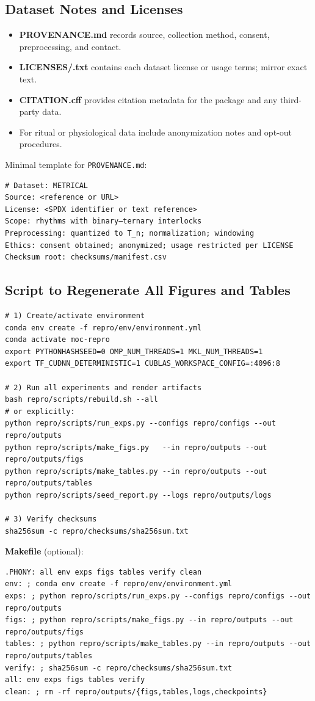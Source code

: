 \documentclass[12pt]{article}
\numberwithin{equation}{section}
\theoremstyle{plain}
\theoremstyle{definition}
\theoremstyle{remark}
\begin{document}
\subsection*{Dataset Notes and Licenses}
\begin{itemize}
  \item \textbf{PROVENANCE.md} records source, collection method, consent, preprocessing, and contact.
  \item \textbf{LICENSES/\*.txt} contains each dataset license or usage terms; mirror exact text.
  \item \textbf{CITATION.cff} provides citation metadata for the package and any third-party data.
  \item For ritual or physiological data include anonymization notes and opt-out procedures.
\end{itemize}
Minimal template for \texttt{PROVENANCE.md}:
\begin{verbatim}
# Dataset: METRICAL
Source: <reference or URL>
License: <SPDX identifier or text reference>
Scope: rhythms with binary–ternary interlocks
Preprocessing: quantized to T_n; normalization; windowing
Ethics: consent obtained; anonymized; usage restricted per LICENSE
Checksum root: checksums/manifest.csv
\end{verbatim}

\subsection*{Script to Regenerate All Figures and Tables}
\begin{verbatim}
# 1) Create/activate environment
conda env create -f repro/env/environment.yml
conda activate moc-repro
export PYTHONHASHSEED=0 OMP_NUM_THREADS=1 MKL_NUM_THREADS=1
export TF_CUDNN_DETERMINISTIC=1 CUBLAS_WORKSPACE_CONFIG=:4096:8

# 2) Run all experiments and render artifacts
bash repro/scripts/rebuild.sh --all
# or explicitly:
python repro/scripts/run_exps.py --configs repro/configs --out repro/outputs
python repro/scripts/make_figs.py   --in repro/outputs --out repro/outputs/figs
python repro/scripts/make_tables.py --in repro/outputs --out repro/outputs/tables
python repro/scripts/seed_report.py --logs repro/outputs/logs

# 3) Verify checksums
sha256sum -c repro/checksums/sha256sum.txt
\end{verbatim}

\noindent \textbf{Makefile} (optional):
\begin{verbatim}
.PHONY: all env exps figs tables verify clean
env: ; conda env create -f repro/env/environment.yml
exps: ; python repro/scripts/run_exps.py --configs repro/configs --out repro/outputs
figs: ; python repro/scripts/make_figs.py --in repro/outputs --out repro/outputs/figs
tables: ; python repro/scripts/make_tables.py --in repro/outputs --out repro/outputs/tables
verify: ; sha256sum -c repro/checksums/sha256sum.txt
all: env exps figs tables verify
clean: ; rm -rf repro/outputs/{figs,tables,logs,checkpoints}
\end{verbatim}
\end{document}
